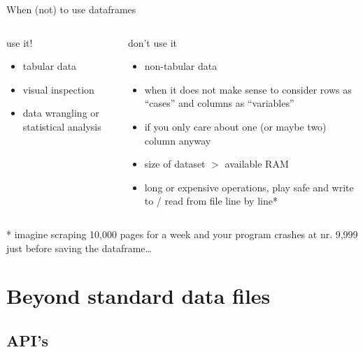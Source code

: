 \documentclass[compress]{beamer}
\begin{document}
\begin{frame}{When (not) to use dataframes}
	\footnotesize
\begin{columns}[T]
\begin{exampleblock}{use it!}
\begin{itemize}
	\item tabular data
	\item visual inspection
	\item data wrangling or statistical analysis
\end{itemize}
\end{exampleblock}
\begin{alertblock}{don't use it}
\begin{itemize}
	\item non-tabular data
	\item when it does not make sense to consider rows as ``cases'' and columns as ``variables''
	\item if you only care about one (or maybe two) column anyway
	\item size of dataset $>$ available RAM 
	\item long or expensive operations, play safe and write to / read from file line by line*
\end{itemize}
\end{alertblock}
\end{columns}

\tiny{* imagine scraping 10,000 pages for a week and your program crashes at nr. 9,999 just before saving the dataframe\ldots}
\end{frame}









\section{Beyond standard data files}
\subsection{API's}
\end{document}
